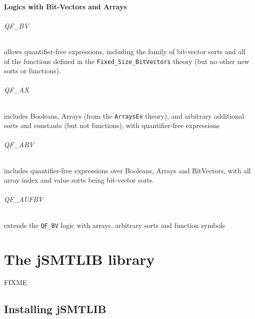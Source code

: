 \documentclass[12pt,oneside]{report}
\begin{document}
\subsection{Logics with Bit-Vectors and Arrays}

\paragraph{QF\_BV} allows quantifier-free expressions, including the family of bit-vector sorts
and all of the functions defined in the {\tt Fixed\_Size\_BitVectors} theory (but no other new sorts or functions).

\paragraph{QF\_AX} includes Booleans, Arrays (from the {\tt ArraysEx} theory), and arbitrary additional sorts and constants (but not functions), with quantifier-free expressions

\paragraph{QF\_ABV} includes quantifier-free expressions over Booleans, Arrays and BitVectors, with all array index and value sorts being bit-vector
 sorts.

\paragraph{QF\_AUFBV} extends the {\tt QF\_BV} logic with arrays, arbitrary sorts and function symbols





\part{The jSMTLIB library}

FIXME

\chapter{Installing jSMTLIB}
\end{document}

